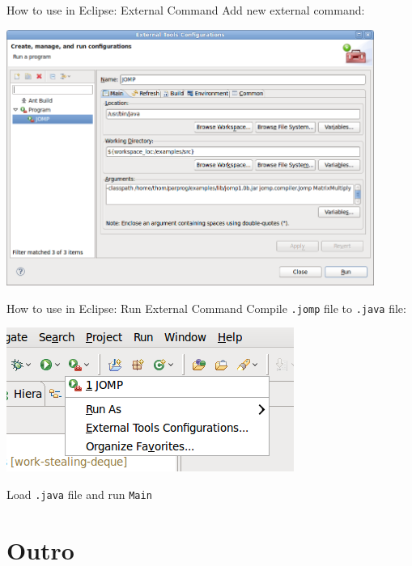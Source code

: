 \begin{frame}{How to use in Eclipse: External Command}
  Add new external command:


  \begin{center}
    \includegraphics[width=0.9\textwidth]{figures/jomp-external-command}
  \end{center}
\end{frame}

\begin{frame}{How to use in Eclipse: Run External Command}
  Compile \lstinline!.jomp! file to \lstinline!.java! file:


  \begin{center}
    \includegraphics[scale=0.7]{figures/jomp-run}
  \end{center}


  Load \lstinline!.java! file and run \lstinline!Main!
\end{frame}


\section*{Outro}

